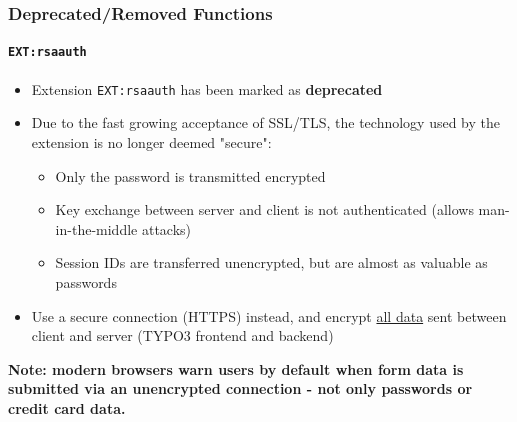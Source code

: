 \begin{frame}[fragile]
	\frametitle{Deprecated/Removed Functions}
	\framesubtitle{\texttt{EXT:rsaauth}}

	\begin{itemize}
		\item Extension \texttt{EXT:rsaauth} has been marked as \textbf{deprecated}
		\item Due to the fast growing acceptance of SSL/TLS, the technology used by
			the extension is no longer deemed "secure":

			\begin{itemize}
				\item Only the password is transmitted encrypted
				\item Key exchange between server and client is not authenticated\newline
					(allows man-in-the-middle attacks)
				\item Session IDs are transferred unencrypted, but are almost as valuable
					as passwords
			\end{itemize}

		\item Use a secure connection (HTTPS) instead, and encrypt \underline{all data}
			sent between client and server (TYPO3 frontend and backend)

	\end{itemize}

	\smaller
		\textbf{Note: modern browsers warn users by default when form data is submitted
			via an unencrypted connection - not only passwords or credit card data.}
	\normalsize

\end{frame}

